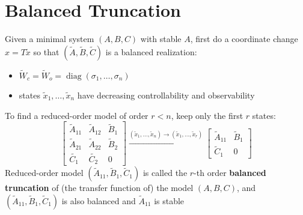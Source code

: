 \documentclass[10pt,a4paper,oneside]{article}
\begin{document}
\section{Balanced Truncation}
Given a minimal system $(A,B,C)$ with stable $A$, first do a coordinate change $x=T\widetilde{x}$ so that $(\widetilde{A},\widetilde{B},\widetilde{C})$ is a balanced realization:
\begin{itemize}
\item $
\widetilde{W}_{c}=\widetilde{W}_{o}=\operatorname{diag}\left(\sigma_{1}, \ldots, \sigma_{n}\right)
$
\item states $
\tilde{x}_{1}, \ldots, \tilde{x}_{n}
$ have decreasing controllability and observability
\end{itemize}
To find a reduced-order model of order $r<n$, keep only the first $r$ states:
\[
\left[\begin{array}{cc|c}{\tilde{A}_{11}} & {\tilde{A}_{12}} & {\tilde{B}_{1}} \\ {\tilde{A}_{21}} & {\tilde{A}_{22}} & {\tilde{B}_{2}} \\ \hline {\tilde{C_{1}}} & {\tilde{C_{2}}} & {0}\end{array}\right]
\stackrel{(\tilde{x}_{1}, \ldots, \tilde{x}_{n}) \rightarrow(\tilde{x}_{1}, \ldots,\tilde{x}_{r})}{\longrightarrow}\left[\begin{array}{c|c}{\tilde{A}_{11}} & {\tilde{B}_{1}} \\ \hline \tilde{C}_{1} & {0}\end{array}\right]
\]
Reduced-order model $(\tilde{A}_{11},\tilde{B}_1,\tilde{C}_1)$ is called the $r$-th order {\bfseries balanced truncation} of (the transfer function of) the model $(A,B,C)$, and $(\tilde{A}_{11},\tilde{B}_1,\tilde{C}_1)$ is also balanced and $\tilde{A}_{11}$ is stable
\end{document}
